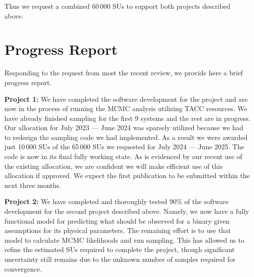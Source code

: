 \documentclass[12pt]{article}
\begin{document}
Thus we request a combined 60\,000 SUs to support both projects described above.

\section{Progress Report}

Responding to the request from most the recent review, we provide here a brief
progress report.

\textbf{Project 1:} We have completed the software development for the project
and are now in the process of running the MCMC analysis utilizing TACC
resources. We have already finished sampling for the first 9 systems and the
rest are in progress. Our allocation for July 2023 --- June 2024 was sparsely
utilized because we had to redesign the sampling code we had implemented. As a
result we were awarded just 10\,000 SUs of the 65\,000 SUs we requested for July
2024 --- June 2025. The code is now in its final fully working state. As is
evidenced by our recent use of the existing allocation, we are confident we will
make efficient use of this allocation if approved. We expect the first
publication to be submitted within the next three months.

\textbf{Project 2:} We have completed and thoroughly tested 90\% of the software
development for the second project described above. Namely, we now have a fully
functional model for predicting what should be observed for a binary given
assumptions for its physical parameters. The remaining effort is to use that
model to calculate MCMC likelihoods and run sampling. This has allowed us to
refine the estimated SUs required to complete the project, though significant
uncertainty still remains due to the unknown number of samples required for
convergence.

\newpage

\section*{}




\end{document}
